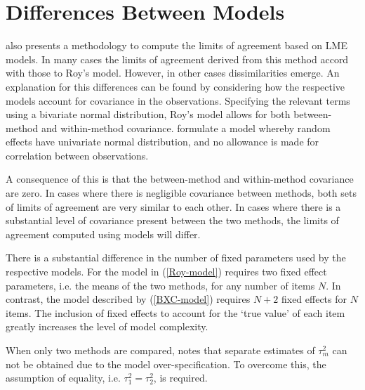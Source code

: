 \documentclass[12pt, a4paper]{report}
\theoremstyle{plain}
\theoremstyle{definition}
\theoremstyle{remark}
\begin{document}


	\section{Differences Between Models}
	\citet{BXC2008} also presents a methodology to compute the limits of agreement based on LME models. In many cases the limits of agreement derived from this method accord with those to Roy's model. However, in other cases dissimilarities emerge. An explanation for this differences can be found by considering how the respective models account for covariance in the observations. Specifying the relevant terms using a bivariate normal distribution, Roy's model allows for both between-method and within-method covariance. \citet{BXC2008} formulate a model whereby random effects have univariate normal distribution, and no allowance is made for correlation between observations.
	
	A consequence of this is that the between-method and within-method covariance are zero. In cases where there is negligible covariance between methods, both sets of limits of agreement are very similar to each other. In cases where there is a substantial level of covariance present between the two methods, the limits of agreement computed using models will differ.
	
	There is a substantial difference in the number of fixed parameters used by the respective models. For the model in (\ref{Roy-model}) requires two fixed effect parameters, i.e. the means of the two methods, for any number of items $N$. In contrast, the model described by (\ref{BXC-model}) requires $N+2$ fixed effects for $N$ items. The inclusion of fixed effects to account for the `true value' of each item greatly increases the level of model complexity.
	
	When only two methods are compared, \citet{BXC2008} notes that separate estimates of $\tau^2_m$ can not be obtained due to the model over-specification. To overcome this, the assumption of equality, i.e. $\tau^2_1 = \tau^2_2$, is required.
	\newpage
	
\end{document}
